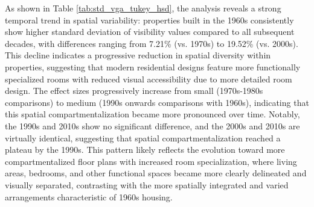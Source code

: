 As shown in Table \ref{tab:std_vga_tukey_hsd}, the analysis reveals a strong temporal trend in spatial variability: properties built in the 1960s 
consistently show higher standard deviation of visibility values compared to all subsequent decades, with differences 
ranging from 7.21\% (vs. 1970s) to 19.52\% (vs. 2000s). This decline indicates a progressive 
reduction in spatial diversity within properties, suggesting that modern residential designs 
feature more functionally specialized rooms with reduced visual accessibility due to more detailed room design. 
The effect sizes progressively increase from small (1970s-1980s comparisons) to medium 
(1990s onwards comparisons with 1960s), indicating that this spatial compartmentalization became 
more pronounced over time. Notably, the 1990s and 2010s show no significant difference, and the 
2000s and 2010s are virtually identical, suggesting that spatial compartmentalization reached a 
plateau by the 1990s. This pattern likely reflects the evolution toward more compartmentalized 
floor plans with increased room specialization, where living areas, bedrooms, and other functional 
spaces became more clearly delineated and visually separated, contrasting with the more spatially 
integrated and varied arrangements characteristic of 1960s housing.

